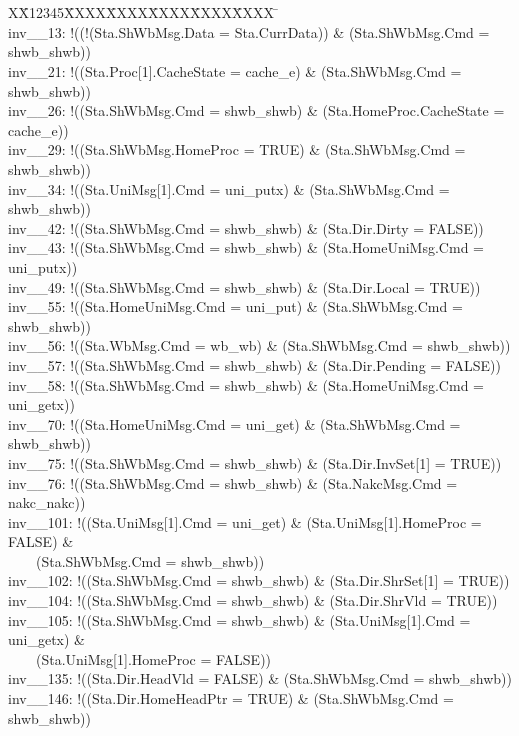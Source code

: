 \documentclass{llncs}
\newlength{\fminilength}
\newenvironment{fmini}[1][\linewidth]
  {\setlength{\fminilength}{#1\fboxsep-2\fboxrule}%
   \vspace{2ex}\noindent\begin{lrbox}{\fminibox}\begin{minipage}{\fminilength}%
   \mbox{ }\hfill\vspace{-2.5ex}}%
  {\end{minipage}\end{lrbox}\vspace{1ex}\hspace{0ex}%
   \framebox{\usebox{\fminibox}}}
\newenvironment{specification}
{\noindent\scriptsize
\tt\begin{fmini}\begin{tabbing}X\=X12345\=XXXX\=XXXX\=XXXX\=XXXX\=XXXX
\=\+\kill} {\end{tabbing}\normalfont\end{fmini}}
\begin{document}
\begin{specification}\\
inv\_\_13: !((!(Sta.ShWbMsg.Data = Sta.CurrData)) \& (Sta.ShWbMsg.Cmd = shwb\_shwb))\\
inv\_\_21: !((Sta.Proc[1].CacheState = cache\_e) \& (Sta.ShWbMsg.Cmd = shwb\_shwb))\\
inv\_\_26: !((Sta.ShWbMsg.Cmd = shwb\_shwb) \& (Sta.HomeProc.CacheState = cache\_e))\\
inv\_\_29: !((Sta.ShWbMsg.HomeProc = TRUE) \& (Sta.ShWbMsg.Cmd = shwb\_shwb))\\
inv\_\_34: !((Sta.UniMsg[1].Cmd = uni\_putx) \& (Sta.ShWbMsg.Cmd = shwb\_shwb))\\
inv\_\_42: !((Sta.ShWbMsg.Cmd = shwb\_shwb) \& (Sta.Dir.Dirty = FALSE))\\
inv\_\_43: !((Sta.ShWbMsg.Cmd = shwb\_shwb) \& (Sta.HomeUniMsg.Cmd = uni\_putx))\\
inv\_\_49: !((Sta.ShWbMsg.Cmd = shwb\_shwb) \& (Sta.Dir.Local = TRUE))\\
inv\_\_55: !((Sta.HomeUniMsg.Cmd = uni\_put) \& (Sta.ShWbMsg.Cmd = shwb\_shwb))\\
inv\_\_56: !((Sta.WbMsg.Cmd = wb\_wb) \& (Sta.ShWbMsg.Cmd = shwb\_shwb))\\
inv\_\_57: !((Sta.ShWbMsg.Cmd = shwb\_shwb) \& (Sta.Dir.Pending = FALSE))\\
inv\_\_58: !((Sta.ShWbMsg.Cmd = shwb\_shwb) \& (Sta.HomeUniMsg.Cmd = uni\_getx))\\
inv\_\_70: !((Sta.HomeUniMsg.Cmd = uni\_get) \& (Sta.ShWbMsg.Cmd = shwb\_shwb))\\
inv\_\_75: !((Sta.ShWbMsg.Cmd = shwb\_shwb) \& (Sta.Dir.InvSet[1] = TRUE))\\
inv\_\_76: !((Sta.ShWbMsg.Cmd = shwb\_shwb) \& (Sta.NakcMsg.Cmd = nakc\_nakc))\\
inv\_\_101: !((Sta.UniMsg[1].Cmd = uni\_get) \& (Sta.UniMsg[1].HomeProc = FALSE) \&\\ ~~~~(Sta.ShWbMsg.Cmd = shwb\_shwb))\\
inv\_\_102: !((Sta.ShWbMsg.Cmd = shwb\_shwb) \& (Sta.Dir.ShrSet[1] = TRUE))\\
inv\_\_104: !((Sta.ShWbMsg.Cmd = shwb\_shwb) \& (Sta.Dir.ShrVld = TRUE))\\
inv\_\_105: !((Sta.ShWbMsg.Cmd = shwb\_shwb) \& (Sta.UniMsg[1].Cmd = uni\_getx) \&\\~~~~(Sta.UniMsg[1].HomeProc = FALSE))\\
inv\_\_135: !((Sta.Dir.HeadVld = FALSE) \& (Sta.ShWbMsg.Cmd = shwb\_shwb))\\
inv\_\_146: !((Sta.Dir.HomeHeadPtr = TRUE) \& (Sta.ShWbMsg.Cmd = shwb\_shwb))\\
\end{specification}
\end{document}
